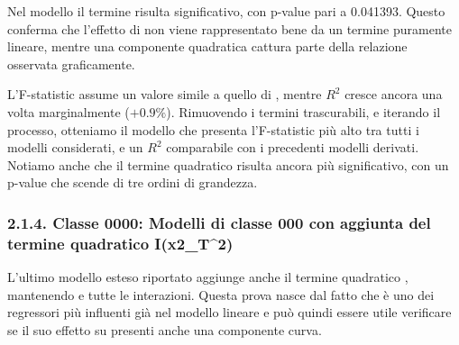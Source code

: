 Nel modello \texttt{} il termine \texttt{} risulta significativo, con p-value pari a 0.041393. Questo conferma che l'effetto di \texttt{} non viene rappresentato bene da un termine puramente lineare, mentre una componente quadratica cattura parte della relazione osservata graficamente.

L'F-statistic assume un valore simile a quello di \texttt{}, mentre $R^2$ cresce ancora una volta marginalmente ($+0.9\%$). Rimuovendo i termini trascurabili, e iterando il processo, otteniamo il modello \texttt{} che presenta l'F-statistic più alto tra tutti i modelli considerati, e un $R^2$ comparabile con i precedenti modelli derivati. Notiamo anche che il termine quadratico \texttt{} risulta ancora più significativo, con un p-value che scende di tre ordini di grandezza.

\subsubsection{2.1.4. Classe 0000: Modelli di classe 000 con aggiunta del termine quadratico I(x2\_T\textasciicircum{}2)}
\label{sec:214-classe-0000-modelli-di-classe-000-con-aggiunta-del-termine-quadratico-ix2t2}

L'ultimo modello esteso riportato aggiunge anche il termine quadratico \texttt{}, mantenendo \texttt{} e tutte le interazioni. Questa prova nasce dal fatto che \texttt{} è uno dei regressori più influenti già nel modello lineare e può quindi essere utile verificare se il suo effetto su \texttt{} presenti anche una componente curva.

